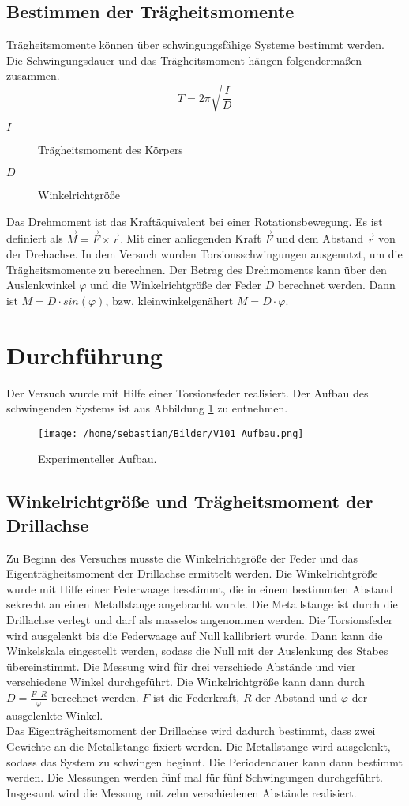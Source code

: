 \documentclass[parskip=half, bibliography=totoc]{scrartcl}
\begin{document}
\subsection{Bestimmen der Trägheitsmomente}
Trägheitsmomente können über schwingungsfähige Systeme bestimmt werden. Die Schwingungsdauer und das Trägheitsmoment hängen folgendermaßen zusammen.
\begin{equation*}
  T = 2\pi \sqrt{\frac{I}{D}}
\end{equation*}
\begin{description}
  \item[$I$]Trägheitsmoment des Körpers
  \item[$D$]Winkelrichtgröße
\end{description}
Das Drehmoment ist das Kraftäquivalent bei einer Rotationsbewegung. Es ist definiert als $\vec{M} = \vec{F} \times \vec{r}.$ Mit einer anliegenden Kraft $\vec{F}$ und dem Abstand $\vec{r}$ von der Drehachse.
In dem Versuch wurden Torsionsschwingungen ausgenutzt, um die Trägheitsmomente zu berechnen. Der Betrag des Drehmoments kann über den Auslenkwinkel $\varphi$ und die Winkelrichtgröße der Feder $D$ berechnet werden. Dann ist $M = D\cdot sin(\varphi)$, bzw. kleinwinkelgenähert $M = D\cdot\varphi$.
\section{Durchführung}
Der Versuch wurde mit Hilfe einer Torsionsfeder realisiert. Der Aufbau des schwingenden Systems ist aus Abbildung \ref{fig:Aufbau} zu entnehmen.
\begin{figure}
  \centering
  \texttt{[image: /home/sebastian/Bilder/V101\_Aufbau.png]}
  \caption{Experimenteller Aufbau.\cite{anleitung01}\protect}
  \label{fig:Aufbau}
\end{figure}
\FloatBarrier
\subsection{Winkelrichtgröße und Trägheitsmoment der Drillachse}
Zu Beginn des Versuches musste die Winkelrichtgröße der Feder und das Eigenträgheitsmoment der Drillachse ermittelt werden. Die Winkelrichtgröße wurde mit Hilfe einer Federwaage besstimmt, die in einem bestimmten Abstand sekrecht an einen Metallstange angebracht wurde. Die Metallstange ist durch die Drillachse verlegt und darf als masselos angenommen werden. Die Torsionsfeder wird ausgelenkt bis die Federwaage auf Null kallibriert wurde. Dann kann die Winkelskala eingestellt werden, sodass die Null mit der Auslenkung des Stabes übereinstimmt. Die Messung wird für drei verschiede Abstände und vier verschiedene Winkel durchgeführt. Die Winkelrichtgröße kann dann durch $D = \frac{F\cdot R}{\varphi}$ berechnet werden. $F$ ist die Federkraft, $R$ der Abstand und $\varphi$ der ausgelenkte Winkel.\\
Das Eigenträgheitsmoment der Drillachse wird dadurch bestimmt, dass zwei Gewichte an die Metallstange fixiert werden. Die Metallstange wird ausgelenkt, sodass das System zu schwingen beginnt. Die Periodendauer kann dann bestimmt werden. Die Messungen werden fünf mal für fünf Schwingungen durchgeführt. Insgesamt wird die Messung mit zehn verschiedenen Abstände realisiert.
\end{document}
